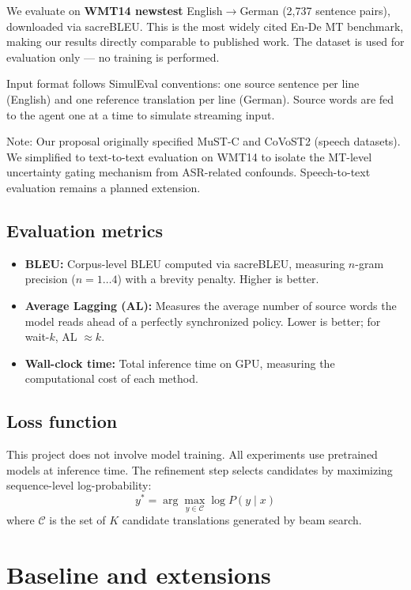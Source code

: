 We evaluate on \textbf{WMT14 newstest} English$\to$German (2,737 sentence pairs), downloaded via sacreBLEU. This is the most widely cited En-De MT benchmark, making our results directly comparable to published work. The dataset is used for evaluation only --- no training is performed.

Input format follows SimulEval conventions: one source sentence per line (English) and one reference translation per line (German). Source words are fed to the agent one at a time to simulate streaming input.

Note: Our proposal originally specified MuST-C and CoVoST2 (speech datasets). We simplified to text-to-text evaluation on WMT14 to isolate the MT-level uncertainty gating mechanism from ASR-related confounds. Speech-to-text evaluation remains a planned extension.

\subsection{Evaluation metrics}

\begin{itemize}[leftmargin=*]
    \item \textbf{BLEU:} Corpus-level BLEU computed via sacreBLEU, measuring $n$-gram precision ($n=1\ldots4$) with a brevity penalty. Higher is better.
    \item \textbf{Average Lagging (AL):} Measures the average number of source words the model reads ahead of a perfectly synchronized policy. Lower is better; for wait-$k$, AL $\approx k$.
    \item \textbf{Wall-clock time:} Total inference time on GPU, measuring the computational cost of each method.
\end{itemize}

\subsection{Loss function}

This project does not involve model training. All experiments use pretrained models at inference time. The refinement step selects candidates by maximizing sequence-level log-probability:
\begin{equation}
y^* = \arg\max_{y \in \mathcal{C}} \log P(y \mid x)
\end{equation}
where $\mathcal{C}$ is the set of $K$ candidate translations generated by beam search.

\section{Baseline and extensions}

